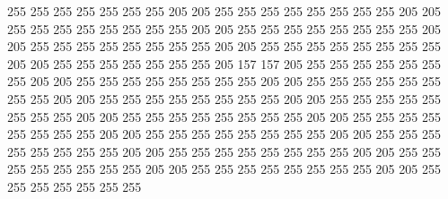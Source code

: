 255 255 255 255 255 255 255 205 205 255 255 255 255 255 255 255 255 205 205 255
255 255 255 255 255 255 255 205 205 255 255 255 255 255 255 255 255 205 205 255
255 255 255 255 255 255 255 205 205 255 255 255 255 255 255 255 255 205 205 255
255 255 255 255 255 255 205 157 157 205 255 255 255 255 255 255 255 205 205 255
255 255 255 255 255 255 255 205 205 255 255 255 255 255 255 255 255 205 205 255
255 255 255 255 255 255 255 205 205 255 255 255 255 255 255 255 255 205 205 255
255 255 255 255 255 255 255 205 205 255 255 255 255 255 255 255 255 205 205 255
255 255 255 255 255 255 255 205 205 255 255 255 255 255 255 255 255 205 205 255
255 255 255 255 255 255 255 205 205 255 255 255 255 255 255 255 255 205 205 255
255 255 255 255 255 255 255 205 205 255 255 255 255 255 255 255
